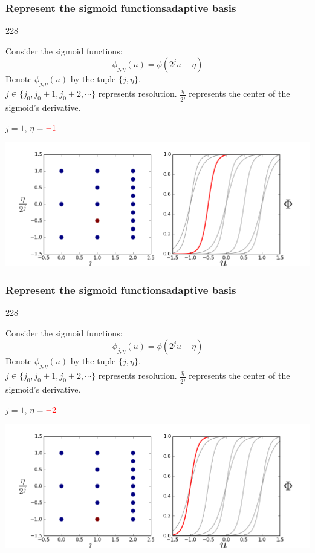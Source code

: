 \documentclass{beamer}
\newcommand{\barrow}{\item[\color{darkred}\ding{228}]}
\begin{document}
\setcounter{framenumber}{15} 
\begin{frame}
    \frametitle{Represent the sigmoid functions\hfill \scriptsize{adaptive basis}}\small
    \begin{dinglist}{228}
        \barrow
        Consider the sigmoid functions:
        $$
            \phi_{j, \eta}(u) = \phi(2^j u - \eta)
        $$
        Denote $\phi_{j, \eta}(u)$ by the tuple $\{j, \eta\}$.\\
        \vspace{.2cm}
        $j\in \{j_0, j_0+1, j_0+2, \cdots \}$ represents resolution. $\frac{\eta}{2^j}$ represents
        the center of the sigmoid's derivative.
        \barrow $j=1$, $\eta=\textcolor{red}{-1}$\\
        \begin{center}
            \includegraphics[width=10.cm]{basis_4.png}
        \end{center}
    \end{dinglist}
\end{frame}

\setcounter{framenumber}{15} 
\begin{frame}
    \frametitle{Represent the sigmoid functions\hfill \scriptsize{adaptive basis}}\small
    \begin{dinglist}{228}
        \barrow
        Consider the sigmoid functions:
        $$
            \phi_{j, \eta}(u) = \phi(2^j u - \eta)
        $$
        Denote $\phi_{j, \eta}(u)$ by the tuple $\{j, \eta\}$.\\
        \vspace{.2cm}
        $j\in \{j_0, j_0+1, j_0+2, \cdots \}$ represents resolution. $\frac{\eta}{2^j}$ represents
        the center of the sigmoid's derivative.
        \barrow $j=1$, $\eta=\textcolor{red}{-2}$\\
        \begin{center}
            \includegraphics[width=10.cm]{basis_5.png}
        \end{center}
    \end{dinglist}
\end{frame}
\end{document}

